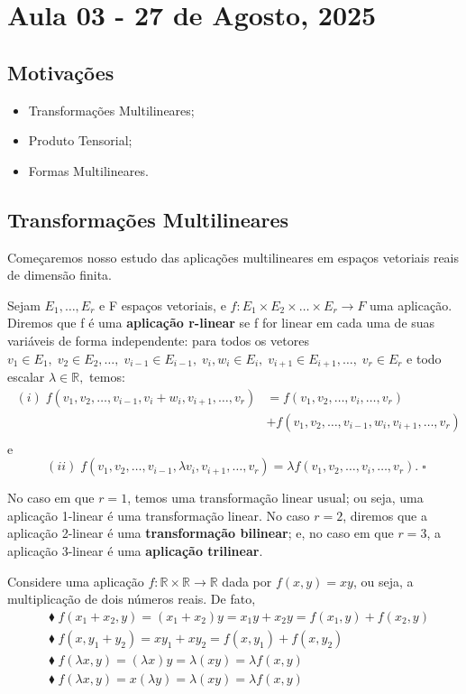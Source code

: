 \documentclass[../differential_forms.tex]{subfiles}
\begin{document}
\section{Aula 03 - 27 de Agosto, 2025}
\subsection{Motivações}
\begin{itemize}
	\item Transformações Multilineares;
	\item Produto Tensorial;
	\item Formas Multilineares.
\end{itemize}
\subsection{Transformações Multilineares}
Começaremos nosso estudo das aplicações multilineares em espaços vetoriais reais de dimensão finita.
\begin{def*}
	Sejam \(E_1, \dotsc , E_r\) e F espaços vetoriais, e \(f:E_1\times E_2\times \dotsc \times E_r\rightarrow F\) uma aplicação. Diremos que f é uma \textbf{aplicação r-linear} se f for linear em cada uma de suas variáveis de forma independente: para todos os vetores \(v_1\in E_1,\; v_2\in E_2,\dotsc,\; v_{i-1}\in E_{i-1},\; v_{i},w_{i}\in E_{i},\; v_{i+1}\in E_{i+1}, \dotsc ,\; v_r\in E_r\) e todo escalar \(\lambda \in \mathbb{R},\) temos:
	\begin{align*}
		\;(i)\; f(v_1, v_2, \dotsc, v_{i-1}, v_{i}+w_{i},v_{i+1}, \dotsc ,v_r) & = f(v_1, v_2, \dotsc , v_{i}, \dotsc , v_r)                   \\
		                                                                       & + f(v_1, v_2, \dotsc , v_{i-1}, w_{i}, v_{i+1}, \dotsc , v_r) \\
	\end{align*}
	e
	\[
		\;(ii)\; f(v_1, v_2, \dotsc, v_{i-1}, \lambda v_{i},v_{i+1}, \dotsc ,v_r) = \lambda f(v_1, v_2, \dotsc , v_{i}, \dotsc , v_r).\; \square
	\]
\end{def*}
No caso em que \(r=1\), temos uma transformação linear usual; ou seja, uma aplicação 1-linear é uma transformação linear. No caso \(r=2\), diremos que a aplicação 2-linear é uma \textbf{transformação bilinear}; e, no caso em que \(r=3\), a aplicação 3-linear é uma \textbf{aplicação trilinear}.
\begin{example}
	Considere uma aplicação \(f:\mathbb{R}\times \mathbb{R}\rightarrow \mathbb{R}\) dada por \(f(x, y) = xy\), ou seja, a multiplicação de dois números reais. De fato,
	\begin{align*}
		 & \blacklozenge\; f(x_1+x_2, y) = (x_1+x_2)y = x_1 y +x_2 y = f(x_1, y) + f(x_2, y) \\
		 & \blacklozenge\; f(x, y_1+y_2) = xy_1 + xy_2 = f(x, y_1)+f(x, y_2)                 \\
		 & \blacklozenge\; f(\lambda x, y) = (\lambda x)y = \lambda (xy) = \lambda f(x, y)   \\
		 & \blacklozenge\; f(\lambda x, y) = x(\lambda y) = \lambda (xy) = \lambda f(x, y)   \\
	\end{align*}
\end{example}
\end{document}
